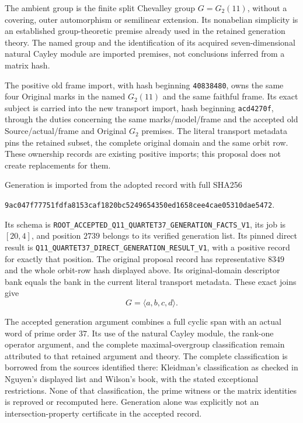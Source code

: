 \documentclass[11pt]{article}
\newcommand{\gen}[1]{\langle #1\rangle}
\begin{document}
The ambient group is the finite split Chevalley group $G=G_2(11)$,
without a covering, outer automorphism or semilinear extension.  Its
nonabelian simplicity is an established group-theoretic premise already
used in the retained generation theory.  The named group and the
identification of its acquired seven-dimensional natural Cayley module
are imported premises, not conclusions inferred from a matrix hash.

The positive old frame import, with hash beginning \texttt{40838480},
owns the same four Original marks in the named $G_2(11)$ and the same
faithful frame.  Its exact subject is carried into the new transport
import, hash beginning \texttt{acd4270f}, through the duties concerning
the same marks/model/frame and the accepted old Source/actual/frame and
Original $G_2$ premises.  The literal transport metadata pins the
retained subset, the complete original domain and the same orbit row.
These ownership records are existing positive imports; this proposal
does not create replacements for them.

Generation is imported from the adopted record with full SHA256
\begin{center}\small\texttt{9ac047f77751fdfa8153caf1820bc5249654350ed1658cee4cae05310dae5472}.\end{center}
Its schema is \texttt{ROOT\_ACCEPTED\_Q11\_QUARTET37\_GENERATION\_FACTS\_V1},
its job is $[20,4]$, and position $2739$ belongs to its verified generation
list.  Its pinned direct result is
\texttt{Q11\_QUARTET37\_DIRECT\_GENERATION\_RESULT\_V1}, with a positive
record for exactly that position.  The original proposal record has
representative $8349$ and the whole orbit-row hash displayed above.
Its original-domain descriptor bank equals the bank in the current
literal transport metadata.  These exact joins give
\begin{equation}\label{eq:generation}
                         G=\gen{a,b,c,d}.
\end{equation}

The accepted generation argument combines a full cyclic span with an
actual word of prime order $37$.  Its use of the natural Cayley module,
the rank-one operator argument, and the complete maximal-overgroup
classification remain attributed to that retained argument and theory.
The complete classification is borrowed from the sources identified
there: Kleidman's classification as checked in Nguyen's displayed list
and Wilson's book, with the stated exceptional restrictions.  None of
that classification, the prime witness or the matrix identities is
reproved or recomputed here.  Generation alone was explicitly not an
intersection-property certificate in the accepted record.
\end{document}
